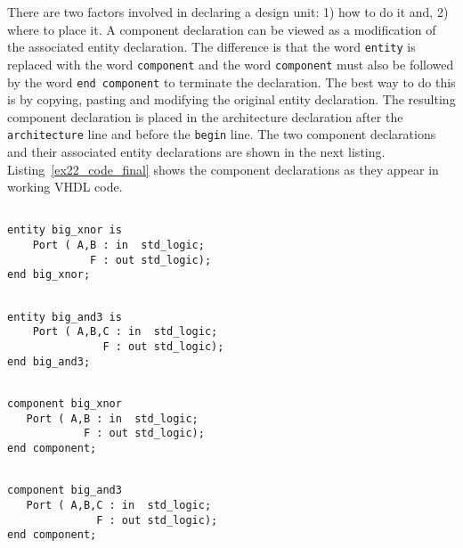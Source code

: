 There are two factors involved in declaring a design unit: 1) how to do it and, 2) where to place it. A component declaration can be viewed as a modification of the associated entity declaration. The difference is that the word \texttt{entity} is replaced with the word \texttt{component} and the word \texttt{component} must also be followed by the word \texttt{end component} to terminate the declaration. The best way to do this is by copying, pasting and modifying the original entity declaration. The resulting component declaration is placed in the architecture declaration after the \texttt{architecture} line and before the \texttt{begin} line. The two component declarations and their associated entity declarations are shown in the next listing. Listing~\ref{ex22_code_final} shows the component declarations as they appear in working VHDL code.

\noindent
\begin{minipage}[t]{0.48\textwidth}
\vspace{0pt}
\noindent
\begin{lstlisting}[]

entity big_xnor is
    Port ( A,B : in  std_logic;
             F : out std_logic);
end big_xnor;
\end{lstlisting}
\begin{lstlisting}[]

entity big_and3 is
    Port ( A,B,C : in  std_logic;
               F : out std_logic);
end big_and3;
\end{lstlisting}
\end{minipage}
\begin{minipage}[t]{0.48\textwidth}
\vspace{0pt}\raggedright
\begin{lstlisting}[]

component big_xnor 
   Port ( A,B : in  std_logic;
            F : out std_logic);
end component;
\end{lstlisting}
\begin{lstlisting}[]

component big_and3 
   Port ( A,B,C : in  std_logic;
              F : out std_logic);
end component;
\end{lstlisting}
\end{minipage}

